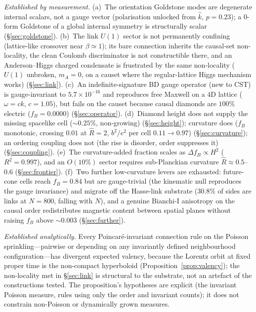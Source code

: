 \documentclass[aps,prd,reprint,nofootinbib,superscriptaddress,floatfix]{revtex4-2}
\newcommand{\Rhat}{\hat R}
\newcommand{\fracB}{f_{\!B}}
\newcounter{proposition}
\begin{document}
\emph{Established by measurement.}
(a)~The orientation Goldstone modes are degenerate internal scalars, not a gauge vector
(polarisation unlocked from $\hat k$, $p=0.23$); a $0$-form Goldstone of a global
internal symmetry is structurally scalar (\S\ref{sec:goldstone}).
(b)~The link $U(1)$ sector is not permanently confining (lattice-like crossover near
$\beta\simeq1$); its bare connection inherits the causal-set non-locality, the clean
Coulomb discriminator is not constructible there, and an Anderson--Higgs charged
condensate is frustrated by the same non-locality ($U(1)$ unbroken, $m_A=0$, on a causet
where the regular-lattice Higgs mechanism works) (\S\ref{sec:link}).
(c)~An indefinite-signature BD gauge operator (new to CST) is gauge-invariant to
$5.7\times10^{-16}$ and reproduces free Maxwell on a $4$D lattice ($\omega=ck$,
$c=1.05$), but fails on the causet because causal diamonds are $100\%$ electric
($\fracB=0.0000$) (\S\ref{sec:operator}).
(d)~Diamond height does not supply the missing spacelike cell ($\sim0.25\%$,
non-growing) (\S\ref{sec:height}); curvature does ($\fracB$ monotonic, crossing $0.01$ at
$\Rhat=2$, $b^2/e^2$ per cell $0.11\to0.97$) (\S\ref{sec:curvature}); an ordering coupling
does not (the rise is disorder, order suppresses it) (\S\ref{sec:coupling}).
(e)~The curvature-added fraction scales as $\Delta\fracB\propto H^2$ ($R^2=0.997$), and an
$O(10\%)$ sector requires sub-Planckian curvature $\Rhat\approx0.5$--$0.6$
(\S\ref{sec:frontier}).
(f)~Two further low-curvature levers are exhausted: future-cone cells reach $\fracB=0.84$
but are gauge-trivial (the kinematic null reproduces the gauge invariance) and migrate off
the Hasse-link substrate ($30.8\%$ of sides are links at $N=800$, falling with $N$), and a
genuine Bianchi-I anisotropy on the causal order redistributes magnetic content between
spatial planes without raising $\fracB$ above $\sim0.003$ (\S\ref{sec:further}).

\emph{Established analytically.} Every Poincar\'e-invariant connection rule on the
Poisson sprinkling---pairwise or depending on any invariantly defined neighbourhood
configuration---has divergent expected valency, because the Lorentz orbit at fixed
proper time is the non-compact hyperboloid (Proposition~\ref{prop:valency}); the
non-locality met in \S\ref{sec:link} is structural to the substrate, not an artefact of
the constructions tested. The proposition's hypotheses are explicit (the invariant
Poisson measure, rules using only the order and invariant counts); it does not
constrain non-Poisson or dynamically grown measures.
\end{document}
